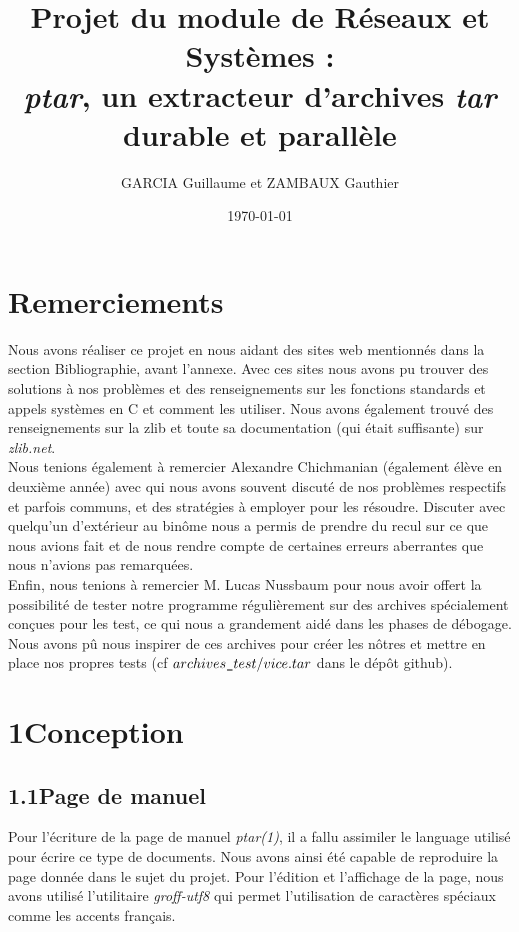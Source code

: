 \documentclass[12pt, a4paper]{report}
\title{Projet du module de Réseaux et Systèmes :\\ \textit{ptar}, un extracteur d'archives \textit{tar} durable et parallèle}
\author{GARCIA  Guillaume et ZAMBAUX Gauthier}
\date{\today}
\begin{document}
\maketitle


\chapter*{Remerciements}

\hspace{1cm}Nous avons réaliser ce projet en nous aidant des sites web mentionnés dans la section Bibliographie, avant l'annexe. Avec ces sites nous avons pu trouver des solutions à nos problèmes et des renseignements sur les fonctions standards et appels systèmes en C et comment les utiliser. Nous avons également trouvé des renseignements sur la zlib et toute sa documentation (qui était suffisante) sur \textit{zlib.net}.\\

\hspace{0.5cm}Nous tenions également à remercier Alexandre Chichmanian (également élève en deuxième année) avec qui nous avons souvent discuté de nos problèmes respectifs et parfois communs, et des stratégies à employer pour les résoudre. Discuter avec quelqu'un d'extérieur au binôme nous a permis de prendre du recul sur ce que nous avions fait et de nous rendre compte de certaines erreurs aberrantes que nous n'avions pas remarquées.\\

\hspace{0.5cm}Enfin, nous tenions à remercier M. Lucas Nussbaum pour nous avoir offert la possibilité de tester notre programme régulièrement sur des archives spécialement conçues pour les test, ce qui nous a grandement aidé dans les phases de débogage. Nous avons pû nous inspirer de ces archives pour créer les nôtres et mettre en place nos propres tests (cf $archives\verb|_|test/vice.tar$ dans le dépôt github).


\chapter*{1\hspace{1cm}Conception}

\section*{\hspace{0.6cm}1.1\hspace{0.6cm}Page de manuel}
\hspace{1cm}Pour l'écriture de la page de manuel \textit{ptar(1)}, il a fallu assimiler le language utilisé pour écrire ce type de documents. Nous avons ainsi été capable de reproduire la page donnée dans le sujet du projet. Pour l'édition et l'affichage de la page, nous avons utilisé l'utilitaire \textit{groff-utf8} qui permet l'utilisation de caractères spéciaux comme les accents français. \\
\end{document}
